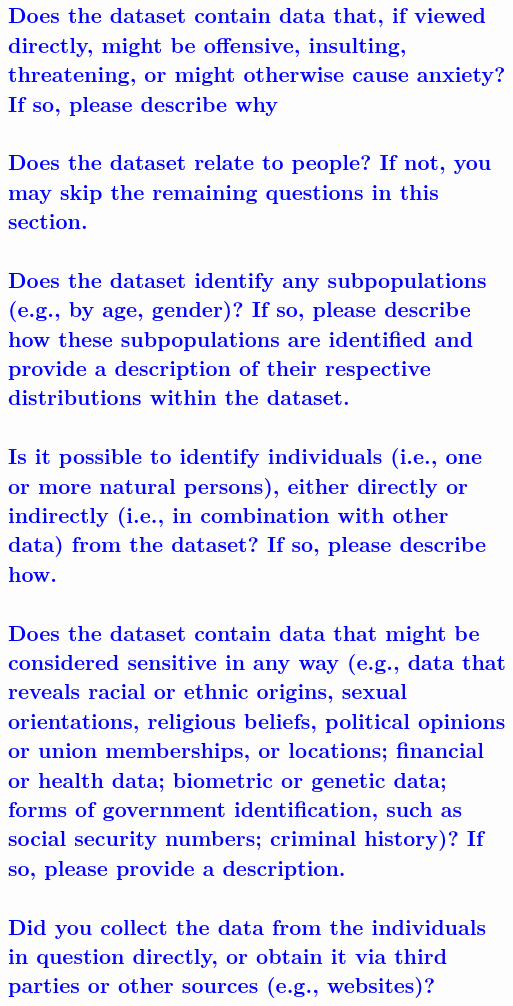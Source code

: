 \documentclass[letterpaper, 10 pt, conference]{ieeeconf}  %
\begin{document}
\textcolor{blue}{\subsection{Does the dataset contain data that, if viewed directly, might be offensive, insulting, threatening, or might otherwise cause anxiety? If so,
please describe why}}
\lipsum[1]

\textcolor{blue}{\subsection{Does the dataset relate to people? If not, you may skip the remaining
questions in this section.}}
\lipsum[1]

\textcolor{blue}{\subsection{Does the dataset identify any subpopulations (e.g., by age, gender)?
If so, please describe how these subpopulations are identified and provide
a description of their respective distributions within the dataset.}}
\lipsum[1]

\textcolor{blue}{\subsection{Is it possible to identify individuals (i.e., one or more natural persons), either directly or indirectly (i.e., in combination with other
data) from the dataset? If so, please describe how.}}
\lipsum[1]

\textcolor{blue}{\subsection{Does the dataset contain data that might be considered sensitive in
any way (e.g., data that reveals racial or ethnic origins, sexual orientations, religious beliefs, political opinions or union memberships, or
locations; financial or health data; biometric or genetic data; forms of
government identification, such as social security numbers; criminal
history)? If so, please provide a description.}}
\lipsum[1]

\textcolor{blue}{\subsection{Did you collect the data from the individuals in question directly, or
obtain it via third parties or other sources (e.g., websites)?}}
\lipsum[1]
\end{document}
